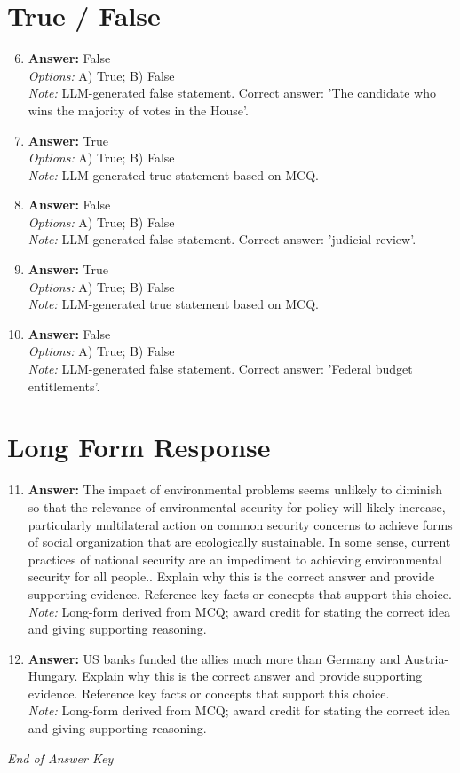 \documentclass[12pt]{article}
\begin{document}
\section*{True / False}
\begin{enumerate}[label=\arabic*.]
\setcounter{enumi}{5}
\item \textbf{Answer:} False
\\ \textit{Options:} A) True; B) False
\\ \textit{Note:} LLM-generated false statement. Correct answer: 'The candidate who wins the majority of votes in the House'.
\item \textbf{Answer:} True
\\ \textit{Options:} A) True; B) False
\\ \textit{Note:} LLM-generated true statement based on MCQ.
\item \textbf{Answer:} False
\\ \textit{Options:} A) True; B) False
\\ \textit{Note:} LLM-generated false statement. Correct answer: 'judicial review'.
\item \textbf{Answer:} True
\\ \textit{Options:} A) True; B) False
\\ \textit{Note:} LLM-generated true statement based on MCQ.
\item \textbf{Answer:} False
\\ \textit{Options:} A) True; B) False
\\ \textit{Note:} LLM-generated false statement. Correct answer: 'Federal budget entitlements'.
\end{enumerate}

\section*{Long Form Response}
\begin{enumerate}[label=\arabic*.]
\setcounter{enumi}{10}
\item \textbf{Answer:} The impact of environmental problems seems unlikely to diminish so that the relevance of environmental security for policy will likely increase, particularly multilateral action on common security concerns to achieve forms of social organization that are ecologically sustainable. In some sense, current practices of national security are an impediment to achieving environmental security for all people.. Explain why this is the correct answer and provide supporting evidence. Reference key facts or concepts that support this choice.
\\ \textit{Note:} Long-form derived from MCQ; award credit for stating the correct idea and giving supporting reasoning.
\item \textbf{Answer:} US banks funded the allies much more than Germany and Austria-Hungary. Explain why this is the correct answer and provide supporting evidence. Reference key facts or concepts that support this choice.
\\ \textit{Note:} Long-form derived from MCQ; award credit for stating the correct idea and giving supporting reasoning.
\end{enumerate}

\vfill
\noindent\textit{End of Answer Key}
\end{document}
